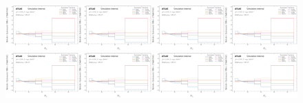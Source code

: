 \begin{figure}[h!]
\centering
\includegraphics[width=0.25\textwidth,page=1]{figures/SimResults/MultiFold_Theory_SystEffect.pdf}\includegraphics[width=0.25\textwidth,page=2]{figures/SimResults/MultiFold_Theory_SystEffect.pdf}\includegraphics[width=0.25\textwidth,page=3]{figures/SimResults/MultiFold_Theory_SystEffect.pdf}\includegraphics[width=0.25\textwidth,page=4]{figures/SimResults/MultiFold_Theory_SystEffect.pdf}\\
\includegraphics[width=0.25\textwidth,page=5]{figures/SimResults/MultiFold_Theory_SystEffect.pdf}\includegraphics[width=0.25\textwidth,page=7]{figures/SimResults/MultiFold_Theory_SystEffect.pdf}\includegraphics[width=0.25\textwidth,page=7]{figures/SimResults/MultiFold_Theory_SystEffect.pdf}\includegraphics[width=0.25\textwidth,page=8]{figures/SimResults/MultiFold_Theory_SystEffect.pdf}\\

\end{figure}
